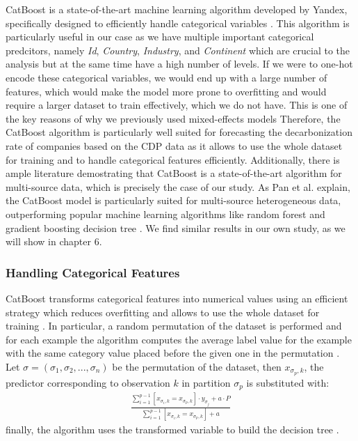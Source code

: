 CatBoost is a state-of-the-art machine learning algorithm developed by Yandex, specifically designed to efficiently handle categorical variables \cite{prokhorenkova2018catboost}. This algorithm is particularly useful in our case as we have multiple important categorical predcitors, namely \textit{Id}, \textit{Country}, \textit{Industry}, and \textit{Continent} which are crucial to the analysis but at the same time have a high number of levels. If we were to one-hot encode these categorical variables, we would end up with a large number of features, which would make the model more prone to overfitting and would require a larger dataset to train effectively, which we do not have. This is one of the key reasons of why we previously used mixed-effects models Therefore, the CatBoost algorithm is particularly well suited for forecasting the decarbonization rate of companies based on the CDP data as it allows to use the whole dataset for training and to handle categorical features efficiently. Additionally, there is ample literature demostrating that CatBoost is a state-of-the-art algorithm for multi-source data, which is precisely the case of our study. As Pan et al. explain, the CatBoost model is particularly suited for multi-source heterogeneous data, outperforming popular machine learning algorithms like random forest and gradient boosting decision tree \cite{Pan2020Data}. We find similar results in our own study, as we will show in chapter 6.

\subsubsection{Handling Categorical Features}

CatBoost transforms categorical features into numerical values using an efficient strategy which reduces overfitting and allows to use the whole dataset for training \cite{dorogush2018catboost}. 
In particular, a random permutation of the dataset is performed and for each example the algorithm computes the average label value for the example with the same category value placed before the given one in the permutation \cite{dorogush2018catboost}. Let $\sigma = (\sigma_1, \sigma_2, ..., \sigma_n)$ be the permutation of the dataset, then $x_{\sigma_p, k}$, the predictor corresponding to observation $k$ in partition $\sigma_p$ is substituted with:
\begin{align}
    \frac{\sum_{i=1}^{p-1} [x_{\sigma_i, k} = x_{\sigma_p, k}] \cdot y_{\sigma_j} + a \cdot P }{\sum_{i=1}^{p-1} [x_{\sigma_i, k} = x_{\sigma_p, k}] + a}
\end{align}
\noindent finally, the algorithm uses the transformed variable to build the decision tree \cite{dorogush2018catboost}.

